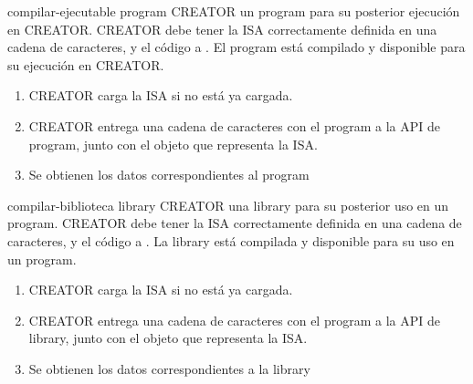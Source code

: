 \begin{useCase}{compilar-ejecutable}
    { \gls{program}} %
    {CREATOR} %
    { un \gls{program} para su posterior ejecución en CREATOR.} %
    {CREATOR debe tener la \gls{ISA} correctamente definida en una cadena de caracteres, y el código a .} %
    {El \gls{program} está compilado y disponible para su ejecución en CREATOR.} %
    \begin{enumerate}[leftmargin=*, topsep=0pt, noitemsep]
        \item CREATOR carga la \gls{ISA} si no está ya cargada.
        \item CREATOR entrega una cadena de caracteres con el \gls{program}
        a la \gls{API} de  \gls{program}, junto
        con el objeto que representa la \gls{ISA}.
        \item Se obtienen los datos correspondientes al \gls{program}
    \end{enumerate}
\end{useCase}

\begin{useCase}{compilar-biblioteca}
    { \gls{library}} %
    {CREATOR} %
    { una \gls{library} para su posterior uso en un \gls{program}.} %
    {CREATOR debe tener la \gls{ISA} correctamente definida en una cadena de caracteres, y el código a .} %
    {La \gls{library} está compilada y disponible para su uso en un \gls{program}.} %
    \begin{enumerate}[leftmargin=*, topsep=0pt, noitemsep]
        \item CREATOR carga la \gls{ISA} si no está ya cargada.
        \item CREATOR entrega una cadena de caracteres con el \gls{program}
        a la \gls{API} de  \gls{library}, junto
        con el objeto que representa la \gls{ISA}.
        \item Se obtienen los datos correspondientes a la \gls{library}
    \end{enumerate}
\end{useCase}
